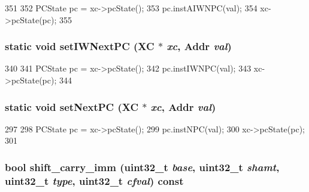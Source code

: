 \begin{DoxyCode}
351     {
352         PCState pc = xc->pcState();
353         pc.instAIWNPC(val);
354         xc->pcState(pc);
355     }
\end{DoxyCode}
\hypertarget{classArmISA_1_1ArmStaticInst_a7ef87b5f37a06b7143d275af2ab6444a}{
\subsubsection[{setIWNextPC}]{\setlength{\rightskip}{0pt plus 5cm}static void setIWNextPC (XC $\ast$ {\em xc}, \/  {\bf Addr} {\em val})}}
\label{classArmISA_1_1ArmStaticInst_a7ef87b5f37a06b7143d275af2ab6444a}



\begin{DoxyCode}
340     {
341         PCState pc = xc->pcState();
342         pc.instIWNPC(val);
343         xc->pcState(pc);
344     }
\end{DoxyCode}
\hypertarget{classArmISA_1_1ArmStaticInst_a8a008e37d143524d0c3aba6e7c835f44}{
\subsubsection[{setNextPC}]{\setlength{\rightskip}{0pt plus 5cm}static void setNextPC (XC $\ast$ {\em xc}, \/  {\bf Addr} {\em val})}}
\label{classArmISA_1_1ArmStaticInst_a8a008e37d143524d0c3aba6e7c835f44}



\begin{DoxyCode}
297     {
298         PCState pc = xc->pcState();
299         pc.instNPC(val);
300         xc->pcState(pc);
301     }
\end{DoxyCode}
\hypertarget{classArmISA_1_1ArmStaticInst_a0d5e73a81869e11788298814fcdbc6d5}{
\subsubsection[{shift\_\-carry\_\-imm}]{\setlength{\rightskip}{0pt plus 5cm}bool shift\_\-carry\_\-imm ({\bf uint32\_\-t} {\em base}, \/  {\bf uint32\_\-t} {\em shamt}, \/  {\bf uint32\_\-t} {\em type}, \/  {\bf uint32\_\-t} {\em cfval}) const}}
\label{classArmISA_1_1ArmStaticInst_a0d5e73a81869e11788298814fcdbc6d5}



